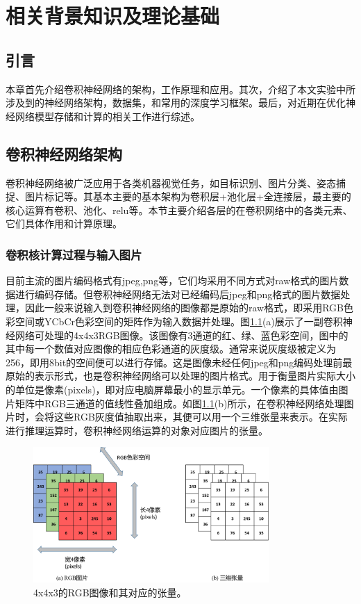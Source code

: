 

\chapter{相关背景知识及理论基础}

\section{引言}

本章首先介绍卷积神经网络的架构，工作原理和应用。其次，介绍了本文实验中所涉及到的神经网络架构，数据集，和常用的深度学习框架。最后，对近期在优化神经网络模型存储和计算的相关工作进行综述。

\section{卷积神经网络架构}
卷积神经网络被广泛应用于各类机器视觉任务，如目标识别、图片分类、姿态捕捉、图片标记等。其基本主要的基本架构为卷积层+池化层+全连接层，最主要的核心运算有卷积、池化、relu等。本节主要介绍各层的在卷积网络中的各类元素、它们具体作用和计算原理。
\subsection{卷积核计算过程与输入图片}
目前主流的图片编码格式有jpeg,png等，它们均采用不同方式对raw格式的图片数据进行编码存储。但卷积神经网络无法对已经编码后jpeg和png格式的图片数据处理，因此一般来说输入到卷积神经网络的图像都是原始的raw格式，即采用RGB色彩空间或YCbCr色彩空间的矩阵作为输入数据并处理。图\ref{inputImage}(a)展示了一副卷积神经网络可处理的4x4x3RGB图像。该图像有3通道的红、绿、蓝色彩空间，图中的其中每一个数值对应图像的相应色彩通道的灰度级。通常来说灰度级被定义为256，即用8bit的空间便可以进行存储。这是图像未经任何jpeg和png编码处理前最原始的表示形式，也是卷积神经网络可以处理的图片格式。用于衡量图片实际大小的单位是像素(pixels)，即对应电脑屏幕最小的显示单元。一个像素的具体值由图片矩阵中RGB三通道的值线性叠加组成。如图\ref{inputImage}(b)所示，在卷积神经网络处理图片时，会将这些RGB灰度值抽取出来，其便可以用一个三维张量来表示。在实际进行推理运算时，卷积神经网络运算的对象对应图片的张量。

\begin{figure}[ht]
	\centering
	\includegraphics[width=0.8\textwidth]{figures/inputImage.png}
	\caption{4x4x3的RGB图像和其对应的张量。}
	\label{inputImage}
\end{figure}

